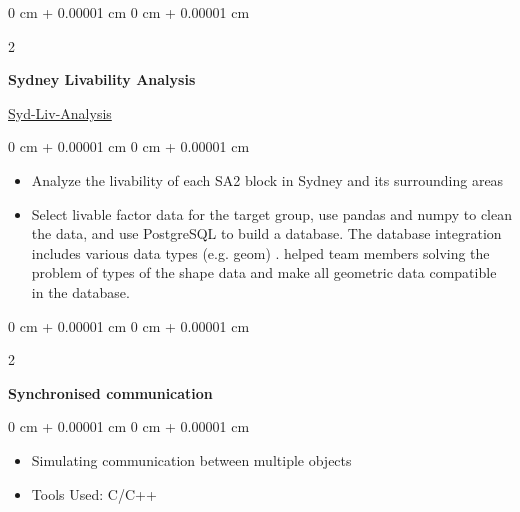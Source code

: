 \documentclass[10pt, letterpaper]{article}
\newenvironment{highlights}{
    \begin{itemize}[
        topsep=0.10 cm,
        parsep=0.10 cm,
        partopsep=0pt,
        itemsep=0pt,
        leftmargin=0 cm + 10pt
    ]
}{
    \end{itemize}
} %
\newenvironment{onecolentry}{
    \begin{adjustwidth}{
        0 cm + 0.00001 cm
    }{
        0 cm + 0.00001 cm
    }
}{
    \end{adjustwidth}
} %
\newenvironment{twocolentry}[2][]{
    \onecolentry
    \def\secondColumn{#2}
    \setcolumnwidth{\fill, 4.5 cm}
    \begin{paracol}{2}
}{
    \switchcolumn \raggedleft \secondColumn
    \end{paracol}
    \endonecolentry
} %
\begin{document}
        \begin{twocolentry}{
            \href{https://github.com/nakani2623/Syd-Liv-Analysis}{Syd-Liv-Analysis}
        }
            \textbf{Sydney Livability Analysis}
        \end{twocolentry}
        \vspace{0.10 cm}
        \begin{onecolentry}
            \begin{highlights}
                \item Analyze the livability of each SA2 block in Sydney and its surrounding areas
                \item Select livable factor data for the target group, use pandas and numpy to clean the data, and use PostgreSQL to build a database. The database integration includes various data types (e.g. geom) .  helped team members solving the problem of types of the shape data and make all geometric data compatible in the database.
            \end{highlights}
        \end{onecolentry}
        \vspace{0.2 cm}


        \begin{twocolentry}{}
        \textbf{Synchronised communication}\end{twocolentry}
        \vspace{0.10 cm}
        \begin{onecolentry}
            \begin{highlights}
                \item Simulating communication between multiple objects
                \item Tools Used: C/C++
            \end{highlights}
        \end{onecolentry}
        \vspace{0.2 cm}
\end{document}
